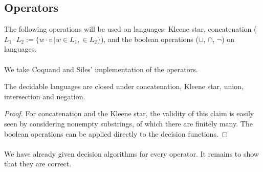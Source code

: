 \documentclass[11pt,a4paper,oneside]{book}
\begin{document}
        \subsection{Operators}
            The following operations will be used on languages: Kleene star, concatenation ($L_1 \cdot L_2 := \{w \cdot v\ \vert w \in L_1,  \in L_2\}$), and the boolean operations ($\cup$, $\cap$, $\neg$) on languages.

            \paragraph{}
                We take Coquand and Siles' implementation of the operators.


                \vspace{-0.4cm}
                \vspace{-0.4cm}
                \vspace{-0.4cm}

            \begin{theorem}{}
                \label{DecLangClosed}
                The decidable languages are closed under concatenation, Kleene star, union, intersection and negation. 
            \end{theorem}
            \begin{proof}
                For concatenation and the Kleene star, the validity of this claim is easily seen by considering nonempty substrings, of which there are finitely many. 
                The boolean operations can be applied directly to the decision functions.
            \end{proof}

            \paragraph{}
                We have already given decision algorithms for every operator. 
                It remains to show that they are correct.
                 
\end{document}
